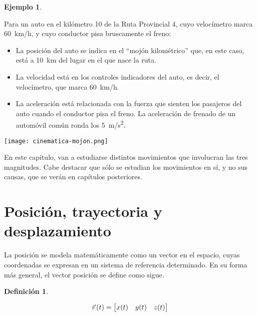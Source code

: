\documentclass[a5paper,12pt,twoside]{book}
\newtheorem{defn}{{Definición}}[chapter]
\newtheorem{example}{{Ejemplo}}[chapter]
\begin{document}
\begin{mdframed}[style=MyFrame2]
    \begin{example}
        \label{eg:mag}
    \end{example}

    Para un auto en el kilómetro 10 de la Ruta Provincial 4, cuyo velocímetro marca \SI{60}{\kilo\meter/\hour}, y cuyo conductor pisa bruscamente el freno:
    \begin{itemize}
        \item La posición del auto se indica en el ``mojón kilométrico'' que, en este caso, está a \SI{10}{km} del lugar en el que nace la ruta.
        \item La velocidad está en los controles indicadores del auto, es decir, el velocímetro, que marca \SI{60}{\kilo\meter/\hour}.
        \item La aceleración está relacionada con la fuerza que sienten los pasajeros del auto cuando el conductor pisa el freno.
        La aceleración de frenado de un automóvil común ronda los \SI{5}{\meter/\second\squared}.
    \end{itemize}

    \begin{center}
        \texttt{[image: cinematica-mojon.png]}
    \end{center}
\end{mdframed}

En este capítulo, van a estudiarse distintos movimientos que involucran las tres magnitudes.
Cabe destacar que sólo se estudian los movimientos en sí, y no sus causas, que se verán en capítulos posteriores.

\section{Posición, trayectoria y desplazamiento}

La posición se modela matemáticamente como un vector en el espacio, cuyas coordenadas se expresan en un sistema de referencia determinado. En su forma más general, el vector posición se define como sigue.

\begin{mdframed}[style=MyFrame1]
    \begin{defn}
        \label{defn:position}
    \end{defn}
    \begin{equation*}
        \vec{r}\hspace{0.05cm}(t) = \begin{bmatrix} x(t) & y(t) & z(t) \end{bmatrix}
    \end{equation*}
\end{mdframed}
\end{document}
